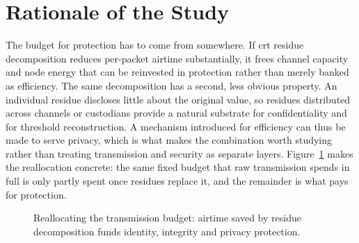 \documentclass[12pt,a4paper,oneside]{book}
\begin{document}
\section{Rationale of the Study}
\label{sec:rationale}

The budget for protection has to come from somewhere. If
\gls{crt} residue decomposition reduces per-packet airtime substantially, it
frees channel capacity and node energy that can be reinvested in protection
rather than merely banked as efficiency. The same decomposition has a second,
less obvious property. An individual residue discloses little about the original
value, so residues distributed across channels or custodians provide a natural
substrate for confidentiality and for threshold reconstruction. A mechanism
introduced for efficiency can thus be made to serve privacy, which is what makes
the combination worth studying rather than treating transmission and security as
separate layers. Figure~\ref{fig:budget-reallocation} makes the reallocation
concrete: the same fixed budget that raw transmission spends in full is only
partly spent once residues replace it, and the remainder is what pays for
protection.

\begin{figure}[htbp]
  \centering
  \caption{Reallocating the transmission budget: airtime saved by residue
           decomposition funds identity, integrity and privacy protection.}
  \label{fig:budget-reallocation}
\end{figure}
\end{document}
